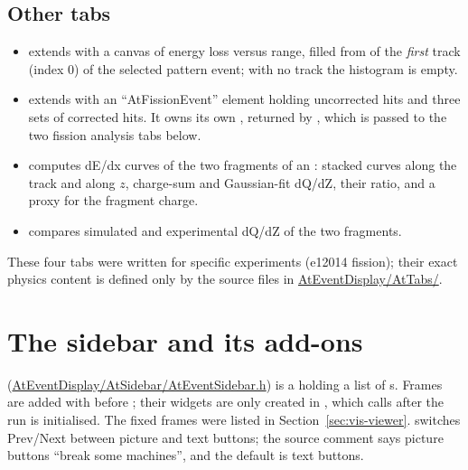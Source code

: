\subsection{Other tabs}

\begin{itemize}
  \item {} extends  with a canvas of energy loss versus range,
        filled from  of the \emph{first} track (index 0) of the
        selected pattern event; with no track the histogram is empty.
  \item {} extends  with an ``AtFissionEvent'' element holding
        uncorrected hits and three sets of corrected hits. It owns its own , returned
        by , which is passed to the two fission analysis tabs below.
  \item {} computes dE/dx curves of the two fragments of an
        : stacked curves along the track and along $z$, charge-sum and
        Gaussian-fit dQ/dZ, their ratio, and a proxy for the fragment charge.
  \item {} compares simulated and experimental dQ/dZ of the
        two fragments.
\end{itemize}
These four tabs were written for specific experiments (e12014 fission); their exact physics
content is defined only by the source files in \url{AtEventDisplay/AtTabs/}.

\section{The sidebar and its add-ons}
\label{sec:vis-sidebar}

 (\url{AtEventDisplay/AtSidebar/AtEventSidebar.h}) is a 
holding a list of s. Frames are added with  before
; their widgets are only created in , which  calls
after the run is initialised. The fixed frames were listed in Section~\ref{sec:vis-viewer}.
 switches Prev/Next between picture and text buttons; the source
comment says picture buttons ``break some machines'', and the default is text buttons.


